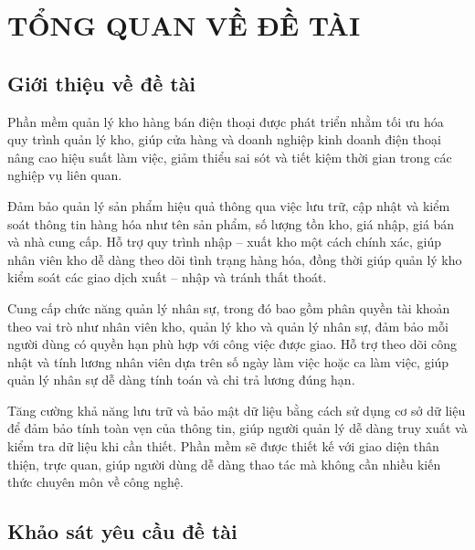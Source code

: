 \documentclass[a4paper,12pt]{report}
\begin{document}
\chapter{TỔNG QUAN VỀ ĐỀ TÀI}
\section{Giới thiệu về đề tài}
\quad Phần mềm quản lý kho hàng bán điện thoại được phát triển nhằm tối ưu hóa quy trình quản lý kho, giúp cửa hàng và doanh nghiệp kinh doanh điện thoại nâng cao hiệu suất làm việc, giảm thiểu sai sót và tiết kiệm thời gian trong các nghiệp vụ liên quan.

\vspace{0.8em}

\quad Đảm bảo quản lý sản phẩm hiệu quả thông qua việc lưu trữ, cập nhật và kiểm soát thông tin hàng hóa như tên sản phẩm, số lượng tồn kho, giá nhập, giá bán và nhà cung cấp. Hỗ trợ quy trình nhập – xuất kho một cách chính xác, giúp nhân viên kho dễ dàng theo dõi tình trạng hàng hóa, đồng thời giúp quản lý kho kiểm soát các giao dịch xuất – nhập và tránh thất thoát.

\vspace{0.8em}

\quad Cung cấp chức năng quản lý nhân sự, trong đó bao gồm phân quyền tài khoản theo vai trò như nhân viên kho, quản lý kho và quản lý nhân sự, đảm bảo mỗi người dùng có quyền hạn phù hợp với công việc được giao. Hỗ trợ theo dõi công nhật và tính lương nhân viên dựa trên số ngày làm việc hoặc ca làm việc, giúp quản lý nhân sự dễ dàng tính toán và chi trả lương đúng hạn.

\vspace{0.8em}

\quad Tăng cường khả năng lưu trữ và bảo mật dữ liệu bằng cách sử dụng cơ sở dữ liệu để đảm bảo tính toàn vẹn của thông tin, giúp người quản lý dễ dàng truy xuất và kiểm tra dữ liệu khi cần thiết. Phần mềm sẽ được thiết kế với giao diện thân thiện, trực quan, giúp người dùng dễ dàng thao tác mà không cần nhiều kiến thức chuyên môn về công nghệ.

\section{Khảo sát yêu cầu đề tài}
\end{document}
